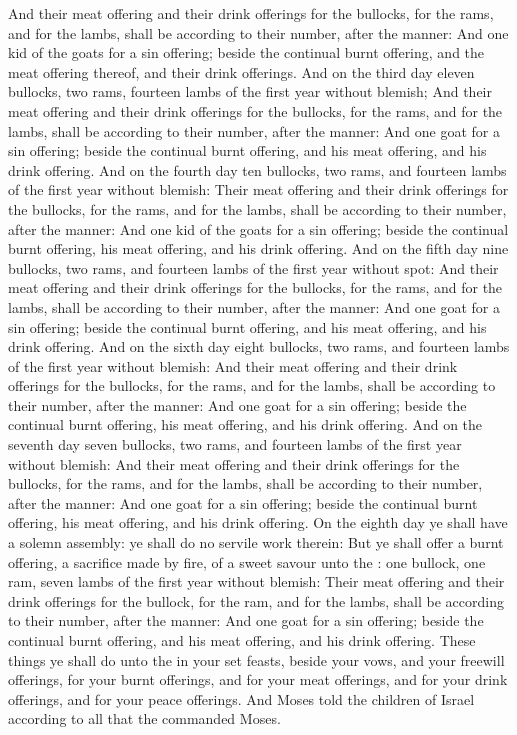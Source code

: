 \begin{biblechapter}
\verse And their meat offering and their drink offerings for the bullocks, for the rams, and for the lambs, shall be according to their number, after the manner:
\verse And one kid of the goats for a sin offering; beside the continual burnt offering, and the meat offering thereof, and their drink offerings.
\verse And on the third day eleven bullocks, two rams, fourteen lambs of the first year without blemish;
\verse And their meat offering and their drink offerings for the bullocks, for the rams, and for the lambs, shall be according to their number, after the manner:
\verse And one goat for a sin offering; beside the continual burnt offering, and his meat offering, and his drink offering.
\verse And on the fourth day ten bullocks, two rams, and fourteen lambs of the first year without blemish:
\verse Their meat offering and their drink offerings for the bullocks, for the rams, and for the lambs, shall be according to their number, after the manner:
\verse And one kid of the goats for a sin offering; beside the continual burnt offering, his meat offering, and his drink offering.
\verse And on the fifth day nine bullocks, two rams, and fourteen lambs of the first year without spot:
\verse And their meat offering and their drink offerings for the bullocks, for the rams, and for the lambs, shall be according to their number, after the manner:
\verse And one goat for a sin offering; beside the continual burnt offering, and his meat offering, and his drink offering.
\verse And on the sixth day eight bullocks, two rams, and fourteen lambs of the first year without blemish:
\verse And their meat offering and their drink offerings for the bullocks, for the rams, and for the lambs, shall be according to their number, after the manner:
\verse And one goat for a sin offering; beside the continual burnt offering, his meat offering, and his drink offering.
\verse And on the seventh day seven bullocks, two rams, and fourteen lambs of the first year without blemish:
\verse And their meat offering and their drink offerings for the bullocks, for the rams, and for the lambs, shall be according to their number, after the manner:
\verse And one goat for a sin offering; beside the continual burnt offering, his meat offering, and his drink offering.
\verse On the eighth day ye shall have a solemn assembly: ye shall do no servile work therein:
\verse But ye shall offer a burnt offering, a sacrifice made by fire, of a sweet savour unto the \LORD: one bullock, one ram, seven lambs of the first year without blemish:
\verse Their meat offering and their drink offerings for the bullock, for the ram, and for the lambs, shall be according to their number, after the manner:
\verse And one goat for a sin offering; beside the continual burnt offering, and his meat offering, and his drink offering.
\verse These things ye shall do unto the \LORD in your set feasts, beside your vows, and your freewill offerings, for your burnt offerings, and for your meat offerings, and for your drink offerings, and for your peace offerings.
\verse And Moses told the children of Israel according to all that the \LORD commanded Moses.
\end{biblechapter}

